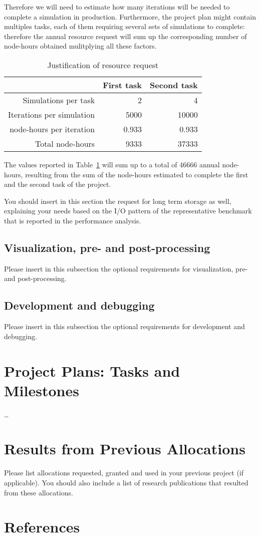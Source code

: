 \documentclass[11pt]{article}
\begin{document}
Therefore we will need to estimate how many iterations will be needed to complete a simulation in production. 
Furthermore, the project plan might contain multiples tasks, each of them requiring several sets of simulations to complete:
therefore the annual resource request will sum up the corresponding number of node-hours obtained mulitplying all these factors. 
\begin{table}[H]
 \begin{center}
  \begin{tabular}{@{}*3{r}@{}}
   \hline \hline
   & First task & Second task \\ 
   \hline \hline
   Simulations per task & 2 & 4 \\
   Iterations per simulation & 5000 & 10000 \\
   node-hours per iteration & 0.933 & 0.933 \\
   Total node-hours & 9333 & 37333 \\
   \hline \hline
  \end{tabular}
 \end{center}
 \caption{Justification of resource request}
 \label{table:resource_request}
\end{table}
The values reported in Table~\ref{table:resource_request} will sum up to a total of 46666 annual node-hours, resulting from the 
sum of the node-hours estimated to complete the first and the second task of the project.

You should insert in this section the request for long term storage as well, explaining your needs 
based on the I/O pattern of the representative benchmark that is reported in the performance analysis. 
 
\subsection{Visualization, pre- and post-processing}
Please insert in this subsection the optional requirements for visualization, pre- and post-processing.

\subsection{Development and debugging}
Please insert in this subsection the optional requirements for development and debugging. 

\section{Project Plans: Tasks and Milestones}
\ldots

\section{Results from Previous Allocations}
Please list allocations requested, granted and used in your previous project (if applicable). 
You should also include a list of research publications that resulted from these allocations.

\section*{References}


\end{document}
